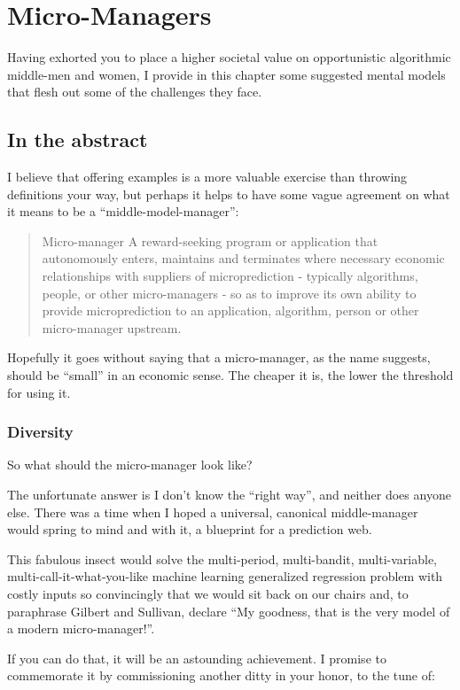 \chapter{Micro-Managers}
\label{chapter:mental}

Having exhorted you to place a higher societal value on opportunistic algorithmic middle-men and women, I provide in this chapter some suggested mental models that flesh out some of the challenges they face. 

\section{In the abstract}

I believe that offering examples is a more valuable exercise than throwing definitions your way, but perhaps it helps to have some vague agreement on what it means to be a ``middle-model-manager'': 

\begin{quote}{Micro-manager}
A reward-seeking program or application that autonomously enters, maintains and terminates where necessary economic relationships with suppliers of microprediction - typically algorithms, people, or other micro-managers - so as to improve its own ability to provide microprediction to an application, algorithm, person or other micro-manager upstream.  
\end{quote}
Hopefully it goes without saying that a micro-manager, as the name suggests, should be ``small'' in an economic sense. The cheaper it is, the lower the threshold for using it.  

\subsection{Diversity}
So what should the micro-manager look like?

The unfortunate answer is I don't know the ``right way'', and neither does anyone else. There was a time when I hoped a universal, canonical middle-manager would spring to mind and with it, a blueprint for a prediction web. 

This fabulous insect would solve the multi-period, multi-bandit, multi-variable, multi-call-it-what-you-like machine learning generalized regression problem with costly inputs so convincingly that we would sit back on our chairs and, to paraphrase Gilbert and Sullivan, declare ``My goodness, that is the very model of a modern micro-manager!''. 

If you can do that, it will be an astounding achievement. I promise to commemorate it by commissioning another ditty in your honor, to the tune of: 

